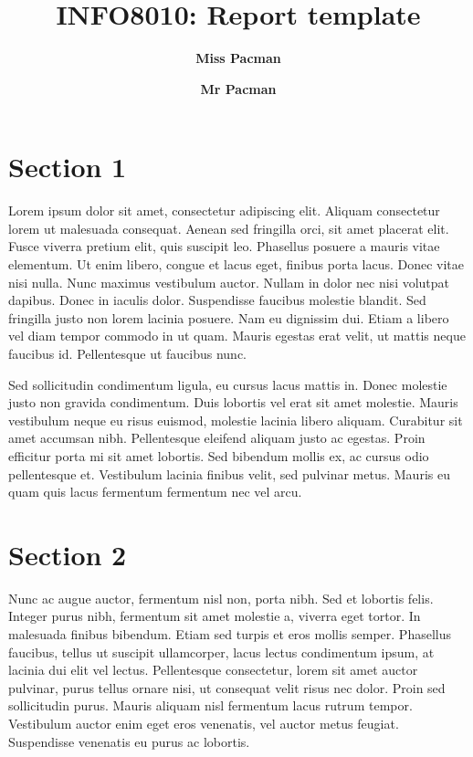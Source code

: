 \documentclass[twocolumn,superscriptaddress,aps]{revtex4-1}
\begin{document}

\title{\Large{INFO8010: Report template}}
\vspace{1cm}
\author{\small{\bf Miss Pacman}}
\author{\small{\bf Mr Pacman}}

\maketitle


\section{Section 1}

Lorem ipsum dolor sit amet, consectetur adipiscing elit. Aliquam consectetur lorem ut malesuada consequat. Aenean sed fringilla orci, sit amet placerat elit. Fusce viverra pretium elit, quis suscipit leo. Phasellus posuere a mauris vitae elementum. Ut enim libero, congue et lacus eget, finibus porta lacus. Donec vitae nisi nulla. Nunc maximus vestibulum auctor. Nullam in dolor nec nisi volutpat dapibus. Donec in iaculis dolor. Suspendisse faucibus molestie blandit. Sed fringilla justo non lorem lacinia posuere. Nam eu dignissim dui. Etiam a libero vel diam tempor commodo in ut quam. Mauris egestas erat velit, ut mattis neque faucibus id. Pellentesque ut faucibus nunc.

Sed sollicitudin condimentum ligula, eu cursus lacus mattis in. Donec molestie justo non gravida condimentum. Duis lobortis vel erat sit amet molestie. Mauris vestibulum neque eu risus euismod, molestie lacinia libero aliquam. Curabitur sit amet accumsan nibh. Pellentesque eleifend aliquam justo ac egestas. Proin efficitur porta mi sit amet lobortis. Sed bibendum mollis ex, ac cursus odio pellentesque et. Vestibulum lacinia finibus velit, sed pulvinar metus. Mauris eu quam quis lacus fermentum fermentum nec vel arcu.

\section{Section 2}

Nunc ac augue auctor, fermentum nisl non, porta nibh. Sed et lobortis felis. Integer purus nibh, fermentum sit amet molestie a, viverra eget tortor. In malesuada finibus bibendum. Etiam sed turpis et eros mollis semper. Phasellus faucibus, tellus ut suscipit ullamcorper, lacus lectus condimentum ipsum, at lacinia dui elit vel lectus. Pellentesque consectetur, lorem sit amet auctor pulvinar, purus tellus ornare nisi, ut consequat velit risus nec dolor. Proin sed sollicitudin purus. Mauris aliquam nisl fermentum lacus rutrum tempor. Vestibulum auctor enim eget eros venenatis, vel auctor metus feugiat. Suspendisse venenatis eu purus ac lobortis.
\end{document}
